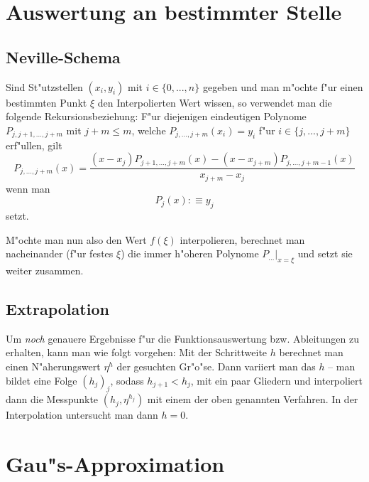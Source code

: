 \documentclass[a4paper]{book}
\begin{document}
\section{Auswertung an bestimmter Stelle}
\label{sec:ausw_an_best_stell}


\subsection{Neville-Schema}
\label{sec:neville_schema}


Sind St"utzstellen $(x_i,y_i)$ mit $i \in \{ 0, ..., n\}$ gegeben und
man m"ochte f"ur einen bestimmten Punkt $\xi$ den Interpolierten Wert
wissen, so verwendet man die folgende Rekursionsbeziehung:
F"ur diejenigen eindeutigen Polynome $P_{j,
  j+1, ..., j+m}$ mit $j+m \leq m$, welche $P_{j, ..., j+m}(x_i) =
y_i$ f"ur $i \in \{j, ..., j+m\}$ erf"ullen, gilt
\begin{equation}
  \label{eq:94}
  P_{j,...,j+m}(x) = \frac{(x-x_j)P_{j+1,...,j+m}(x) -
    (x-x_{j+m})P_{j,...,j+m-1}(x)}{x_{j+m} - x_j}
\end{equation}
wenn man
\begin{equation}
  \label{eq:95}
  P_j(x) : \equiv y_j
\end{equation}
setzt. 

M"ochte man nun also den Wert $f(\xi)$ interpolieren, berechnet man
nacheinander (f"ur festes $\xi$) die immer h"oheren Polynome
$\left. P_{...} \right|_{x = \xi}$ und setzt sie weiter zusammen.






\subsection{Extrapolation}
\label{sec:extrapolation}


Um \emph{noch} genauere Ergebnisse f"ur die Funktionsauswertung
bzw. Ableitungen zu erhalten, kann man wie folgt vorgehen: Mit der
Schrittweite $h$ berechnet man einen N"aherungswert $\eta^h$ der
gesuchten Gr"o"se. Dann variiert man das $h$ -- man bildet eine Folge
$(h_j)_j$, sodass $h_{j+1} < h_j$, mit ein paar Gliedern und
interpoliert dann die Messpunkte $(h_j, \eta^{h_j})$ mit einem der
oben genannten Verfahren. In der Interpolation untersucht man dann
$h=0$.



\section{Gau"s-Approximation}
\label{sec:gaus_approximation}
\end{document}
